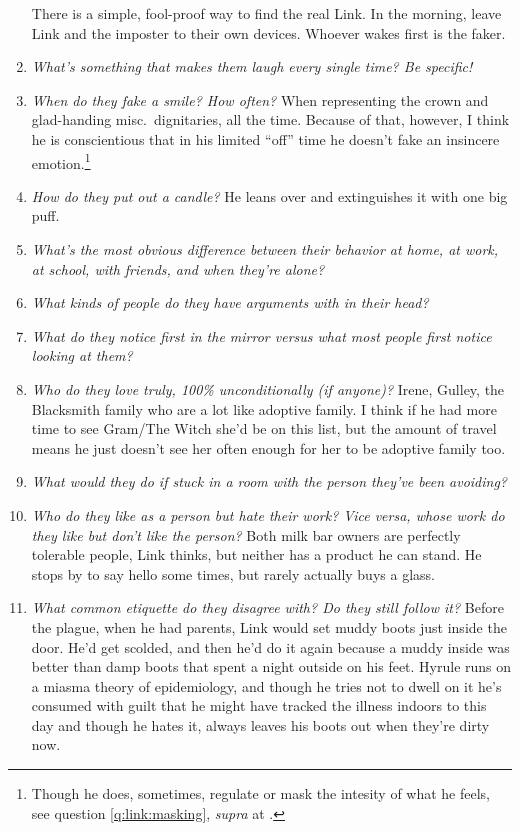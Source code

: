 \begin{enumerate}
        There is a simple, fool-proof way to find the real Link. In the morning, leave Link and the imposter to their own devices. Whoever wakes first is the faker.
    \item\textit{What’s something that makes them laugh every single time? Be specific!}
    \item\textit{When do they fake a smile? How often?}
        When representing the crown and glad-handing misc.~dignitaries, all the time. Because of that, however, I think he is conscientious that in his limited ``off'' time he doesn't fake an insincere emotion.\footnote{Though he does, sometimes, regulate or mask the intesity of what he feels, see question \ref{q:link:masking}, \textit{supra} at \pageref{q:link:masking}.}
    \item\textit{How do they put out a candle?}
        He leans over and extinguishes it with one big puff. 
    \item\textit{What’s the most obvious difference between their behavior at home, at work, at school, with friends, and when they’re alone?} 
    \item\textit{What kinds of people do they have arguments with in their head?}
    \item\textit{What do they notice first in the mirror versus what most people first notice looking at them?} 
    \item\textit{Who do they love truly, 100\% unconditionally (if anyone)?}
        Irene, Gulley, the Blacksmith family who are a lot like adoptive family. I think if he had more time to see Gram/The Witch she'd be on this list, but the amount of travel means he just doesn't see her often enough for her to be adoptive family too.
    \item\textit{What would they do if stuck in a room with the person they’ve been avoiding?}
    \item\textit{Who do they like as a person but hate their work? Vice versa, whose work do they like but don’t like the person?}
        Both milk bar owners are perfectly tolerable people, Link thinks, but neither has a product he can stand. He stops by to say hello some times, but rarely actually buys a glass.
    \item\textit{What common etiquette do they disagree with? Do they still follow it?}\label{q:link:etiquette}
        Before the plague, when he had parents, Link would set muddy boots just inside the door. He'd get scolded, and then he'd do it again because a muddy inside was better than damp boots that spent a night outside on his feet. Hyrule runs on a miasma theory of epidemiology, and though he tries not to dwell on it he's consumed with guilt that he might have tracked the illness indoors to this day and though he hates it, always leaves his boots out when they're dirty now.

\end{enumerate}
